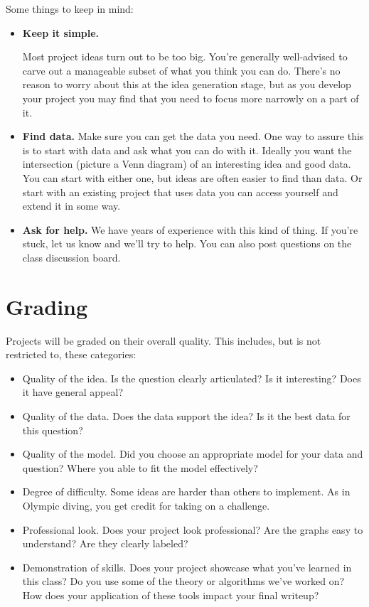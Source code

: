 \documentclass[11pt]{article}
\begin{document}
Some things to keep in mind:
%
\begin{itemize}
  \item {\bf Keep it simple.}

        Most project ideas turn out to be too big.  You're generally well-advised to
        carve out a manageable subset of what you think you can do. There's no reason to
        worry about this at the idea generation stage, but as you develop your project
        you may find that you need to focus more narrowly on a part of it.

  \item {\bf Find data.}  Make sure you can get the data you need. One way to
        assure this is to start with data and ask what you can do with it. Ideally you
        want the intersection (picture a Venn diagram) of an interesting idea and good
        data.  You can start with either one, but ideas are often easier to find than
        data. Or start with an existing project that uses data you can access yourself
        and extend it in some way.


  \item {\bf Ask for help.}
        We have years of experience with this kind of thing. If you're stuck, let us
        know and we'll try to help. You can also post questions on the class discussion
        board.

\end{itemize}


\section*{Grading}

Projects will be graded on their overall quality.  This includes, but is not
restricted to, these categories:
%
\begin{itemize}
  \item Quality of the idea.  Is the question clearly articulated?  Is it
        interesting? Does it have general appeal?
  \item Quality of the data.  Does the data support the idea? Is it the best data
        for this question?
  \item Quality of the model.  Did you choose an appropriate model for your data
        and question? Where you able to fit the model effectively?
  \item Degree of difficulty.  Some ideas are harder than others to implement. As
        in Olympic diving, you get credit for taking on a challenge.
  \item Professional look.  Does your project look professional?  Are the graphs
        easy to understand?  Are they clearly labeled?
  \item Demonstration of skills. Does your project showcase what you've learned in
        this class? Do you use some of the theory or algorithms we've worked on? How
        does your application of these tools impact your final writeup?
\end{itemize}
\end{document}
